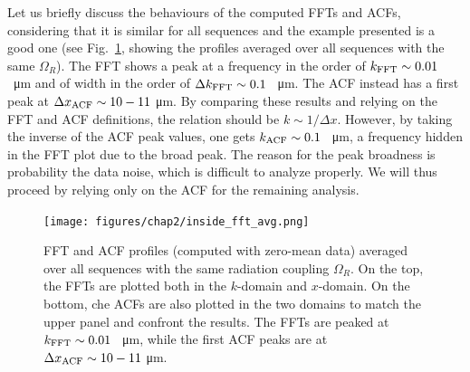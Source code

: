 Let us briefly discuss the behaviours of the computed FFTs and ACFs, considering that it is similar for all sequences and the example presented is a good one (see Fig.\ \ref{fig:inside_avg}, showing the profiles averaged over all sequences with the same $\Omega_R$). The FFT shows a peak at a frequency in the order of $k_{\rm FFT} \sim 0.01$ \unit{\per\micro\meter} and of width in the order of $\Delta k_{\rm FFT} \sim 0.1$ \unit{\per\micro\meter}. The ACF instead has a first peak at $\Delta x_{\rm ACF} \sim 10-11$ \unit{\micro\meter}. By comparing these results and relying on the FFT and ACF definitions, the relation should be $k \sim 1/\Delta x$. However, by taking the inverse of the ACF peak values, one gets $k_{\rm ACF} \sim 0.1$ \unit{\per\micro\meter}, a frequency hidden in the FFT plot due to the broad peak. The reason for the peak broadness is probability the data noise, which is difficult to analyze properly. We will thus proceed by relying only on the ACF for the remaining analysis.

\begin{figure}[t!]
    \centering
    \texttt{[image: figures/chap2/inside\_fft\_avg.png]}
    \caption{FFT and ACF profiles (computed with zero-mean data) averaged over all sequences with the same radiation coupling $\Omega_R$. On the top, the FFTs are plotted both in the $k$-domain and $x$-domain. On the bottom, che ACFs are also plotted in the two domains to match the upper panel and confront the results.
    The FFTs are peaked at $k_{\rm FFT} \sim 0.01$ \unit{\per\micro\meter}, while the first ACF peaks are at $\Delta x_{\rm ACF} \sim 10-11$ \unit{\micro\meter}.}
    \label{fig:inside_avg}
\end{figure}

